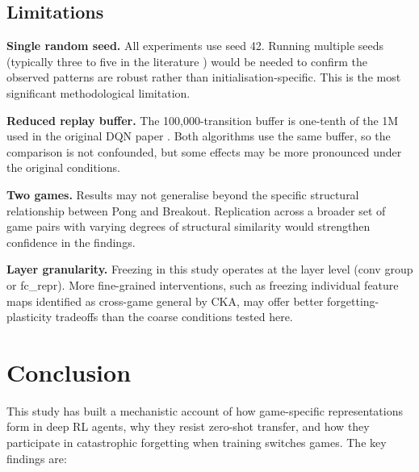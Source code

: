 \documentclass[a4paper]{article}
\begin{document}
\subsection{Limitations}

\textbf{Single random seed.} All experiments use seed 42. Running multiple seeds (typically three to five in the literature \cite{henderson2018deep}) would be needed to confirm the observed patterns are robust rather than initialisation-specific. This is the most significant methodological limitation.

\textbf{Reduced replay buffer.} The 100,000-transition buffer is one-tenth of the 1M used in the original DQN paper \cite{mnih2015human}. Both algorithms use the same buffer, so the comparison is not confounded, but some effects may be more pronounced under the original conditions.

\textbf{Two games.} Results may not generalise beyond the specific structural relationship between Pong and Breakout. Replication across a broader set of game pairs with varying degrees of structural similarity would strengthen confidence in the findings.

\textbf{Layer granularity.} Freezing in this study operates at the layer level (conv group or fc\_repr). More fine-grained interventions, such as freezing individual feature maps identified as cross-game general by CKA, may offer better forgetting-plasticity tradeoffs than the coarse conditions tested here.

\section{Conclusion}
\label{sec:conclusion}

This study has built a mechanistic account of how game-specific representations form in deep RL agents, why they resist zero-shot transfer, and how they participate in catastrophic forgetting when training switches games. The key findings are:
\end{document}

